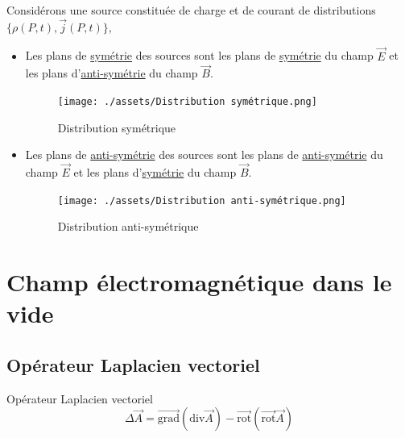 Considérons une source constituée de charge et de courant de distributions $\{\rho(P,t), \overrightarrow{j}(P,t)\}$, 
\begin{itemize}

    \item Les plans de \underline{symétrie} des sources sont les plans de \underline{symétrie} du champ $\overrightarrow{E}$ et les plans d'\underline{anti-symétrie} du champ $\overrightarrow{B}$.

      \begin{figure}[H] %
        \centering
        \texttt{[image: ./assets/Distribution symétrique.png]}
        \caption{Distribution symétrique}
      \end{figure}



      
    \item Les plans de \underline{anti-symétrie} des sources sont les plans de \underline{anti-symétrie} du champ $\overrightarrow{E}$ et les plans d'\underline{symétrie} du champ $\overrightarrow{B}$.

\begin{figure}[H] %
  \centering
  \texttt{[image: ./assets/Distribution anti-symétrique.png]}
  \caption{Distribution anti-symétrique}
\end{figure}

\end{itemize}
\section{Champ électromagnétique dans le vide} %
\label{sec:Champ électromagnétique dans le vide}

\subsection{Opérateur Laplacien vectoriel} %
\label{sub:Operateur Laplacien vectoriel}

\begin{Definition}[colbacktitle=red!75!black]{Opérateur Laplacien vectoriel}{}
\begin{equation}
  \Delta \overrightarrow{A} = \overrightarrow{\mathrm{grad}} ( \mathrm{div} \overrightarrow{A}) - \overrightarrow{\mathrm{rot}} (\overrightarrow{\mathrm{rot}} \overrightarrow{A})
\end{equation}
\end{Definition}

